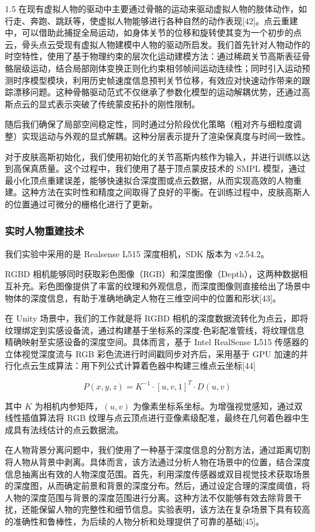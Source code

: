 \documentclass[zihao=-4]{ctexart}
\begin{document}
\begin{spacing}{1.5}
在现有虚拟人物的驱动中主要通过骨骼的运动来驱动虚拟人物的肢体动作，如行走、奔跑、跳跃等，使虚拟人物能够进行各种自然的动作表现[42]。点云重建中，可以借助此捕捉全局运动，如身体关节的位移和旋转使其变为一个初步的点云，骨头点云受现有虚拟人物建模中人物的驱动所启发。我们首先针对人物动作的时空特性，使用了基于物理约束的层次化运动建模方法：通过稀疏关节高斯表征骨骼层级运动，结合局部刚体变换正则化约束相邻帧间运动连续性；同时引入运动预测时序模型模块，利用历史帧速度信息预判关节位移，有效应对快速动作带来的跟踪漂移问题。这种骨骼驱动范式不仅继承了参数化模型的运动解耦优势，还通过高斯点云的显式表示突破了传统蒙皮拓扑的刚性限制。

随后我们确保了局部空间稳定性，同时通过分阶段优化策略（粗对齐与细粒度调整）实现运动与外观的显式解耦。这种分层表示提升了渲染保真度与时间一致性。

对于皮肤高斯初始化，我们使用初始化的关节高斯内核作为输入，并进行训练以达到高保真质量。这个过程中，我们使用了基于顶点蒙皮技术的 SMPL 模型，通过最小化顶点重建误差，能够快速拟合深度图或点云数据，从而实现高效的人物重建。这种方法在实时性和精度之间取得了良好的平衡。在训练过程中，皮肤高斯人的位置通过可微分的栅格化进行了更新。

\subsubsection{实时人物重建技术}

我们实验中采用的是 Realsense L515 深度相机，SDK 版本为 v2.54.2。

RGBD 相机能够同时获取彩色图像（RGB）和深度图像（Depth），这两种数据相互补充。彩色图像提供了丰富的纹理和外观信息，而深度图像则直接给出了场景中物体的深度信息，有助于准确地确定人物在三维空间中的位置和形状[43]。

在 Unity 场景中，我们的工作就是将 RGBD 相机的深度数据流转化为点云，即将纹理绑定到实感设备流，通过构建基于坐标系的深度-色彩配准管线，将纹理信息精确映射至实感设备的深度空间。具体而言，基于 Intel RealSense L515 传感器的立体视觉深度流与 RGB 彩色流进行时间戳同步对齐后，采用基于 GPU 加速的并行化点云生成算法：用下列公式计算着色器中构建三维点云坐标[44]

\begin{equation}
P(x,y,z)=K^{-1}\cdot [u,v,1]^T\cdot D(u,v)
\end{equation}

其中 $K$ 为相机内参矩阵，$(u,v)$ 为像素坐标系坐标。为增强视觉感知，通过双线性插值算法将 RGB 纹理与点云顶点进行亚像素级配准，最终在几何着色器中生成具有法线估计的点云数据流。

在人物背景分离问题中，我们使用了一种基于深度信息的分割方法，通过距离切割将人物从背景中剥离。具体而言，该方法通过分析人物在场景中的位置，结合深度信息抽离出有效的人物深度范围。首先，利用深度传感器或双目视觉技术获取场景的深度图，从而确定前景和背景的深度分布。然后，通过设定合理的深度阈值，将人物的深度范围与背景的深度范围进行分离。这种方法不仅能够有效去除背景干扰，还能保留人物的完整性和细节信息。实验表明，该方法在复杂场景下具有较高的准确性和鲁棒性，为后续的人物分析和处理提供了可靠的基础[45]。


\end{spacing}
\end{document}
